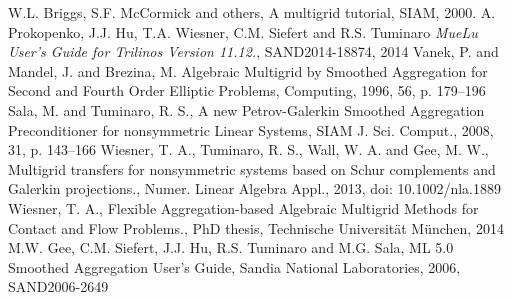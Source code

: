 \documentclass[10pt,fleqn]{book}
\begin{document}
\begin{thebibliography}{99}
 W.L. Briggs, S.F. McCormick and others, A multigrid tutorial, SIAM, 2000.
 A. Prokopenko, J.J. Hu, T.A. Wiesner, C.M. Siefert and R.S. Tuminaro \emph{MueLu User's Guide for Trilinos Version 11.12.}, SAND2014-18874, 2014
 Vanek, P. and Mandel, J. and Brezina, M. Algebraic Multigrid by Smoothed Aggregation for Second and Fourth Order Elliptic Problems, Computing, 1996, 56, p. 179--196
 Sala, M. and Tuminaro, R. S., A new Petrov-Galerkin Smoothed Aggregation Preconditioner for nonsymmetric Linear Systems, SIAM J. Sci. Comput., 2008, 31, p. 143--166
 Wiesner, T. A., Tuminaro, R. S., Wall, W. A. and Gee, M. W., Multigrid transfers for nonsymmetric systems based on Schur complements and Galerkin projections., Numer. Linear Algebra Appl., 2013, doi: 10.1002/nla.1889
 Wiesner, T. A., Flexible Aggregation-based Algebraic Multigrid Methods for Contact and Flow Problems., PhD thesis, Technische Universit\"at M\"unchen, 2014
 M.W. Gee, C.M. Siefert, J.J. Hu, R.S. Tuminaro and M.G. Sala, ML 5.0 Smoothed Aggregation User's Guide, Sandia National Laboratories, 2006, SAND2006-2649
\end{thebibliography}
\end{document}
